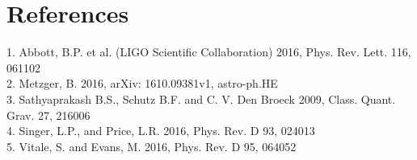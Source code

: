 \documentclass{article}
\begin{document}
\section{References}

1.  Abbott, B.P. et al. (LIGO Scientific Collaboration) 2016, Phys. Rev. Lett. 116, 061102 \\
2.  Metzger, B. 2016, arXiv: 1610.09381v1, astro-ph.HE \\
3.  Sathyaprakash B.S., Schutz B.F. and C. V. Den Broeck 2009, Class. Quant. Grav. 27, 216006 \\
4.  Singer, L.P., and Price, L.R. 2016, Phys. Rev. D 93, 024013 \\
5.  Vitale, S. and Evans, M. 2016, Phys. Rev. D 95, 064052 \\
  
\end{document}
